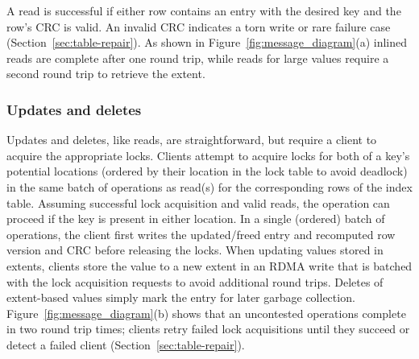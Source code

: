 A read is successful if
either row contains an entry with the desired key and the row's CRC is
valid. An invalid CRC indicates a torn write or rare
failure case (Section~\ref{sec:table-repair}).  As shown in
Figure~\ref{fig:message_diagram}(a) inlined reads are complete after
one round trip, while reads for large values require a second round
trip to retrieve the extent.


\subsubsection{Updates and deletes}

Updates and deletes, like reads, are straightforward, but require a
client to acquire the appropriate locks.  Clients attempt to acquire
locks for both of a key's potential locations (ordered by their
location in the lock table to avoid deadlock) in the same batch of
operations as read(s) for the corresponding rows of the index table.
Assuming successful lock acquisition and valid reads, the operation
can proceed if the key is present in either location.  In a single
(ordered) batch of operations, the client first writes the
updated/freed entry and recomputed row version and CRC before
releasing the locks. When updating values stored in extents, clients
store the value to a new extent in an RDMA write that is batched with
the lock acquisition requests to avoid additional round trips.
Deletes of extent-based values simply mark the entry for later garbage
collection.  Figure~\ref{fig:message_diagram}(b) shows that an
uncontested operations complete in two round trip times; clients
retry failed lock acquisitions until they succeed or detect a failed
client (Section~\ref{sec:table-repair}).




